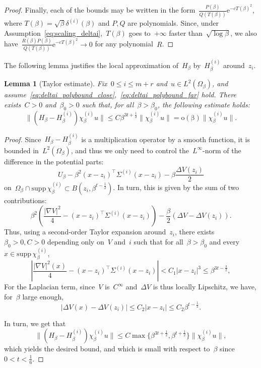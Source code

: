 \documentclass[10pt]{article}
\newcommand{\e}{\mathrm{e}}
\newcommand{\1}{\mathbbm 1}
\newcommand{\scalingExp}{t}
\newtheorem{lemma}{Lemma}
\begin{document}
\begin{proof}
        Finally, each of the bounds may be written in the form~$\frac{P(\beta)}{Q(T(\beta))}\e^{-cT(\beta)^2}$, where $T(\beta) = \sqrt\beta \delta^{(i)}(\beta)$ and $P,Q$ are polynomials. Since, under Assumption~\eqref{eq:scaling_deltai},~$T(\beta)$ goes to~$+\infty$ faster than~$\sqrt{\log\beta}$, we also have~$\frac{R(\beta)P(\beta)}{Q(T(\beta))}\e^{-cT(\beta)^2}\to 0$ for any polynomial~$R$.
    \end{proof}

    The following lemma justifies the local approximation of~$H_\beta$ by~$H_\beta^{(i)}$ around~$z_i$.
    \begin{lemma}[Taylor estimate]
        \label{lemma:taylor_bound}
        Fix~$0\leq i \leq m+r$ and~$u\in L^2(\Omega_\beta)$, and assume~\eqref{eq:deltai_polybound_close},~\eqref{eq:deltai_polybound_far} hold.
        There exists~$C>0$ and~$\beta_0>0$ such that, for all~$\beta>\beta_0$, the following estimate holds:
        \begin{equation}
            \label{eq:taylor_bound_witten}
            \|(H_\beta-H_\beta^{(i)})\chi_\beta^{(i)} u\| \leq C\beta^{3\scalingExp+\frac12}\|\chi_\beta^{(i)}u\| = \mathrm{o(\beta)}\|\chi_\beta^{(i)}u\|.
        \end{equation}
    \end{lemma}
    \begin{proof}
        Since~$H_\beta-H_\beta^{(i)}$ is a multiplication operator by a smooth function, it is bounded in~$L^2(\Omega_\beta)$, and thus we only need to control the~$L^\infty$-norm of the difference in the potential parts:
       ~$$U_\beta - \beta^2(x-z_i)^\intercal \Sigma^{(i)}(x-z_i) - \beta \frac{\Delta V(z_i)}2$$ on~$\Omega_\beta \cap\mathrm{supp}\,\chi_\beta^{(i)} \subset B(z_i,\beta^{\scalingExp-\frac12})$.
        In turn, this is given by the sum of two contributions:
       ~$$ \beta^2\left(\frac{|\nabla V|^2}4 - (x-z_i)^\intercal \Sigma^{(i)}(x-z_i) \right) - \frac\beta2(\Delta V - \Delta V(z_i)).$$
        Thus, using a second-order Taylor expansion around~$z_i$, there exists~$\beta_0>0, C>0$ depending only on~$V$ and~$i$ such that for all~$\beta>\beta_0$ and every~$x\in \mathrm{supp}\,\chi_\beta^{(i)}$, 
       ~$$\left|\frac{|\nabla V|^2(x)}4 - (x-z_i)^\intercal \Sigma^{(i)}(x-z_i)\right| < C_1 |x-z_i|^3 \leq \beta^{3\scalingExp-\frac32},$$
        For the Laplacian term, since~$V$ is~$C^\infty$ and~$\Delta V$ is thus locally Lipschitz, we have, for~$\beta$ large enough,
       ~$$ \left| \Delta V(x) - \Delta V(z_i)\right| \leq C_2|x-z_i|\leq C_2 \beta^{\scalingExp-\frac12}.$$

        In turn, we get that 
       ~$$\|(H_\beta-H_\beta^{(i)})\chi_\beta^{(i)} u\| \leq C\max\{\beta^{3\scalingExp+\frac12},\beta^{\scalingExp+\frac12}\}\|\chi_\beta^{(i)}u\|,$$
        which yields the desired bound, and which is small with respect to~$\beta$ since~$0<\scalingExp<\frac16$.
    \end{proof}
\end{document}
